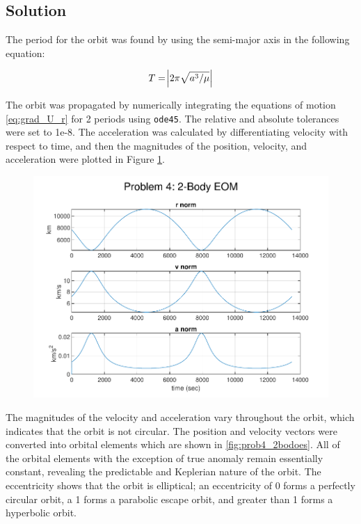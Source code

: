 \documentclass[conf]{new-aiaa}
\begin{document}
\subsection{Solution} 

The period for the orbit was found by using the semi-major axis in the following equation: 

\begin{equation}
T   = \abs{2 \pi \sqrt{a^3 / \mu}}       %
\end{equation}

The orbit was propagated by numerically integrating the equations of motion \ref{eq:grad_U_r} for 2 periods using \texttt{ode45}. The relative and absolute tolerances were set to 1e-8. The acceleration was calculated by differentiating velocity with respect to time, and then the magnitudes of the position, velocity, and acceleration were plotted in Figure \ref{fig:prob4_2bodeom}. 


\begin{figure}[H]
	\centering
	\includegraphics{prob4_2bodeom.pdf}
	\caption{}
	\label{fig:prob4_2bodeom}
\end{figure}

The magnitudes of the velocity and acceleration vary throughout the orbit, which indicates that the orbit is not circular. The position and velocity vectors were converted into orbital elements which are shown in \ref{fig:prob4_2bodoes}. All of the orbital elements with the exception of true anomaly remain essentially constant, revealing the predictable and Keplerian nature of the orbit. The eccentricity shows that the orbit is elliptical; an eccentricity of 0 forms a perfectly circular orbit, a 1 forms a parabolic escape orbit, and greater than 1 forms a hyperbolic orbit. 
\end{document}
